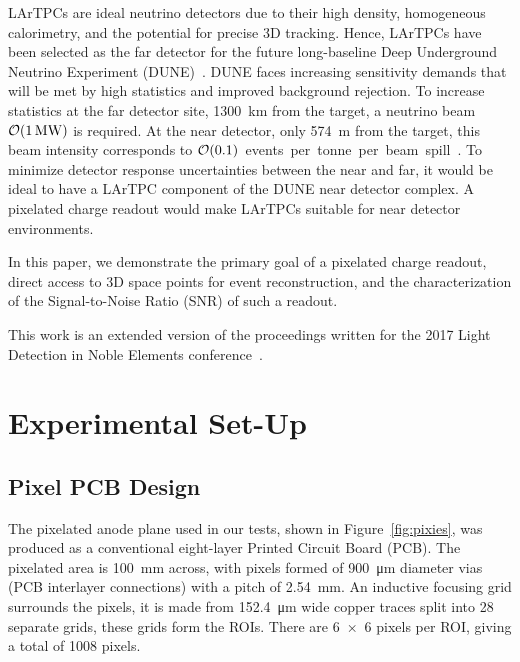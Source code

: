 \documentclass[instruments,article,accept,moreauthors,pdftex]{Definitions/mdpi}
\begin{document}
LArTPCs are ideal neutrino detectors due to their high density, homogeneous calorimetry, and the potential for precise 3D tracking.
Hence, LArTPCs have been selected as the far detector for the future long-baseline Deep Underground Neutrino Experiment (DUNE)~\cite{DUNE}.  
DUNE faces increasing sensitivity demands that will be met by high statistics and improved background rejection. 
To increase statistics at the far detector site, \SI{1300}{\kilo\metre} from the target, a neutrino beam $\order{\SI{1}{\mega\watt}}$ is required.
At the near detector, only \SI{574}{\metre} from the target, this beam intensity corresponds to $\order{0.1}$~events~per~tonne~per~beam~spill~\cite{DUNE2,DUNE3}.
To minimize detector response uncertainties between the near and far, it would be ideal to have a LArTPC component of the DUNE near detector complex.
A pixelated charge readout would make LArTPCs suitable for near detector environments.

In this paper, we demonstrate the primary goal of a pixelated charge readout, direct access to 3D space points for event reconstruction, and the characterization of the Signal-to-Noise Ratio (SNR) of such a readout. 

This work is an extended version of the proceedings written for the 2017 Light Detection in Noble Elements conference~\cite{ldine}.  

\section{Experimental Set-Up}
\vspace{-6pt}

\subsection{Pixel PCB Design} \label{sec:PCB}

The pixelated anode plane used in our tests, shown in Figure~\ref{fig:pixies}, was produced as a conventional eight-layer Printed Circuit Board (PCB). 
The pixelated area is \SI{100}{\milli\metre} across, with pixels formed of \SI{900}{\micro\metre} diameter vias (PCB interlayer connections) with a pitch of \SI{2.54}{\milli\metre}.
An inductive focusing grid surrounds the pixels, it is made from \SI{152.4}{\micro\metre} wide copper traces split into 28 separate grids, these grids form the ROIs.
There are \num{6 x 6} pixels per ROI, giving a total of 1008 pixels. 
\end{document}
